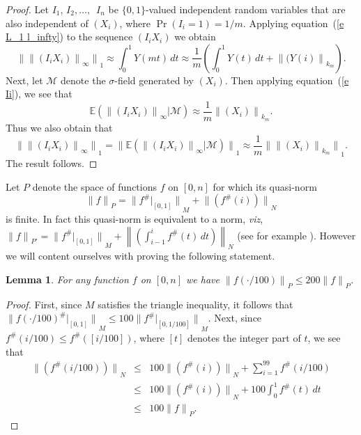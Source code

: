 \documentclass[12pt]{amsart}
\newtheorem{lemma}[thm]{Lemma}
\newcommand{\E}{{\mathbb E}}
\newcommand{\normo}[1]{{\left\|#1\right\|}}
\newcommand{\snormo}[1]{{\mathopen\|#1\mathclose\|}}
\begin{document}
\begin{proof}
Let $I_1$, $I_2,\dots,$\ $I_n$ be $\{0,1\}$-valued
independent random variables that
are also independent of $(X_i)$, where $\Pr(I_i = 1) = 1/m$.  
Applying equation~(\ref{e L_1 l_infty})
to the sequence $(I_i X_i)$ we obtain
\begin{equation}
\label{e Ii}
   \snormo{\snormo{(I_i X_i)}_\infty}_1 
   \approx \int_0^1 Y(mt) \, dt
   \approx \frac1m \left( \int_0^1 Y(t) \, dt + 
   \snormo{(Y(i)}_{k_m} \right).
\end{equation}
Next, let $\mathcal M$ denote the $\sigma$-field generated by $(X_i)$.
Then applying equation~(\ref{e Ii}), we see that
\[
   \E(\snormo{(I_i X_i)}_\infty | \mathcal M)
   \approx \frac1m \snormo{(X_i)}_{k_m} . 
\]
Thus we also obtain that
\[
   \snormo{\snormo{(I_i X_i)}_\infty}_1 
   = \snormo{ \E(\snormo{(I_i X_i)}_\infty | \mathcal M) }_1
   \approx
   \frac1m \snormo{\snormo{(X_i)}_{k_m}}_1 .
\]
The result follows.
\end{proof}

Let $P$ denote the space of functions $f$ on $[0,n]$ for which its quasi-norm
\[
   \snormo f_P = \snormo{f^\#|_{[0,1]}}_M + \snormo{(f^\#(i))}_N
\]
is finite.  
In fact this quasi-norm is equivalent to a norm, \emph{viz},
$\snormo f_{P'} = \snormo{f^\#|_{[0,1]}}_M 
    + \normo{\left(\int_{i-1}^i f^\#(t) \, dt\right)}_N$ (see for example
\cite[Section~7]{montgomery-smith-semenov}).  
However we will content ourselves
with proving the following statement.

\begin{lemma}
\label{l dilate P} For any function $f$ on $[0,n]$ we have
$\snormo{f(\cdot/100)}_P \le 200 \snormo f_P$.
\end{lemma}

\begin{proof}
First, since $M$ satisfies the triangle inequality, it follows
that 
$\snormo{f(\cdot/100)^\#|_{[0,1]}}_M \le 100\snormo{f^\#|_{[0,1/100]}}_M$.  
Next, since $f^\#(i/100) \le f^\#([i/100])$, where $[t]$ denotes the integer
part of $t$, we see that
\begin{eqnarray*}
   \snormo{(f^\#(i/100))}_N 
   &\le& 100 \snormo{(f^\#(i))}_N + \sum_{i=1}^{99} f^\#(i/100) \\
   &\le& 100 \snormo{(f^\#(i))}_N + 100 \int_0^1 f^\#(t) \, dt \\
   &\le& 100 \snormo f_P .
\end{eqnarray*}
\end{proof}
\end{document}
